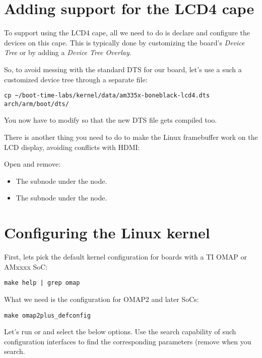\section{Adding support for the LCD4 cape}

To support using the LCD4 cape, all we need to do is declare and
configure the devices on this cape. This is typically done by
customizing the board's {\em Device Tree} or by adding a {\em Device
Tree Overlay}.

So, to avoid messing with the standard DTS for our board, let's use a
such a customized device tree through a separate file:

\begin{verbatim}
cp ~/boot-time-labs/kernel/data/am335x-boneblack-lcd4.dts arch/arm/boot/dts/
\end{verbatim}

You now have to modify  so that
the new DTS file gets compiled too.

There is another thing you need to do to make the Linux framebuffer work
on the LCD display, avoiding conflicts with HDMI:

Open  and remove:
\begin{itemize}
\item The  subnode under the  node.
\item The  subnode under the  node.
\end{itemize}

\section{Configuring the Linux kernel}

First, lets pick the default kernel configuration for boards with a TI
OMAP or AMxxxx SoC:

\begin{verbatim}
make help | grep omap
\end{verbatim}

What we need is the configuration for OMAP2 and later SoCs:
\begin{verbatim}
make omap2plus_defconfig
\end{verbatim}

Let's run  or  and select the
below options. Use the search capability of such configuration
interfaces to find the corresponding parameters (remove 
when you search.

